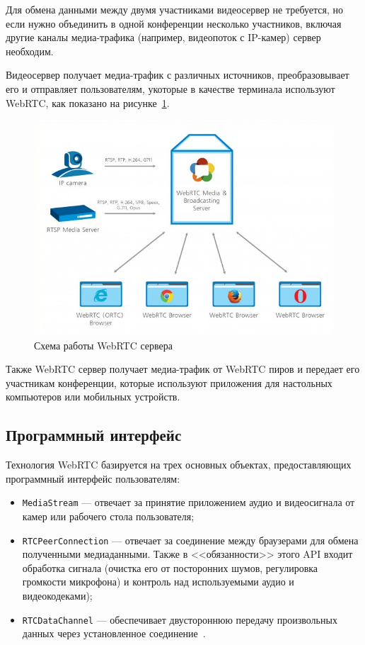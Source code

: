 Для обмена данными между двумя участниками видеосервер не требуется,
но если нужно объединить в одной конференции несколько участников, 
включая другие каналы медиа-трафика (например, видеопоток с IP-камер) сервер необходим.

Видеосервер получает медиа-трафик с различных источников, 
преобразовывает его и отправляет пользователям, 
укоторые в качестве терминала используют WebRTC, 
как показано на рисунке~\ref{pic:webrtc_server}.

\begin{figure}[h!]
  \centering
  \includegraphics[width=150mm]{pic/webrtc_server.png}
  \caption{Схема работы WebRTC сервера}
  \label{pic:webrtc_server}
\end{figure}

Также WebRTC сервер получает медиа-трафик от WebRTC пиров и передает его
участникам конференции, которые используют приложения для настольных компьютеров 
или мобильных устройств.

\subsection{Программный интерфейс}
\label{ssec:webrtc_api}

Технология WebRTC базируется на трех основных объектах,
предоставляющих программный интерфейс пользователям:

\begin{itemize}
\item \texttt{MediaStream} --- отвечает за принятие приложением аудио и видеосигнала
  от камер или рабочего стола пользователя;
\item \texttt{RTCPeerConnection} --- отвечает за соединение между браузерами для
  обмена полученными медиаданными. 
  Также в <<обязанности>> этого API входит обработка сигнала 
  (очистка его от посторонних шумов, регулировка громкости микрофона) и
  контроль над используемыми аудио и видеокодеками);
\item \texttt{RTCDataChannel} --- обеспечивает двустороннюю передачу произвольных
  данных через установленное соединение~\cite{high_perfomance_networking}.
\end{itemize}

